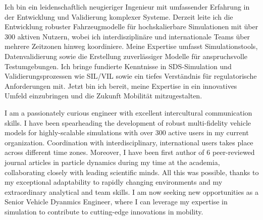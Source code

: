 \documentclass{classic}
\begin{document}
{\rlap{\color{templateColor4}\rule[0mm]{\textwidth}{\ulinewidth}}}
\setlength{\columnsep}{2.5em}
\setlength{\columnseprule}{\ulinewidth}
\begin{paracol}{2}
    {

        Ich bin ein leidenschaftlich neugieriger Ingenieur mit umfassender
        Erfahrung in der Entwicklung und Validierung komplexer Systeme. Derzeit
        leite ich die Entwicklung robuster Fahrzeugmodelle für hochskalierbare
        Simulationen mit \"uber 300 aktiven Nutzern, wobei ich interdisziplinäre
        und internationale Teams über mehrere Zeitzonen hinweg koordiniere.
        Meine Expertise umfasst Simulationstools, Datenvalidierung sowie die
        Erstellung zuverlässiger Modelle f\"ur anspruchsvolle Testumgebungen. Ich
        bringe fundierte Kenntnisse in SDS-Simulation und Validierungsprozessen
        wie SIL/VIL sowie ein tiefes Verst\"andnis für regulatorische Anforderungen
        mit. Jetzt bin ich bereit, meine Expertise in ein innovatives Umfeld
        einzubringen und die Zukunft Mobilität mitzugestalten.

    } 
    { 


        I am a passionately curious engineer with excellent intercultural
        communication skills. I have been spearheading the development of
        robust multi-fidelity vehicle models for highly-scalable simulations
        with over 300 active users in my current organization. Coordination
        with interdisciplinary, international users takes place across
        different time zones. Moreover, I have been first author of 6
        peer-reviewed journal articles in particle dynamics during my time at
        the academia, collaborating closely with leading scientific minds. All
        this was possible, thanks to my exceptional adaptability to rapidly
        changing environments and my extraordinary analytical and team skills.
        I am now seeking new opportunities as a Senior Vehicle Dyanmics
        Engineer, where I can leverage my expertise in simulation to contribute
        to cutting-edge innovations in mobility.\\

    }


\end{paracol}
\end{document}
